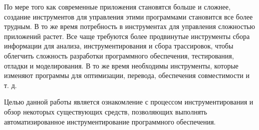 \intro

По мере того как современные приложения становятся больше и сложнее, создание инструментов для управления этими программами становится все более трудным. В то же время потребность в инструментах для управления сложностью приложений растет. Все чаще требуются более продвинутые инструменты сбора информации для анализа, инструментирования и сбора трассировок, чтобы облегчить сложность разработки программного обеспечения, тестирования, отладки и моделирования. В то же время необходимы инструменты, которые изменяют программы для оптимизации, перевода, обеспечения совместимости и т. д.

Целью данной работы является ознакомление с процессом инструментирования и обзор некоторых существующих средств, позволяющих выполнять автоматизированное инструментирование программного обеспечения.

